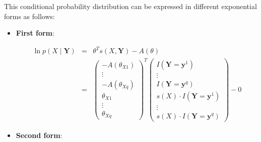 \documentclass[11pt, oneside]{article}   	%
\numberwithin{figure}{section}
\numberwithin{equation}{section}
\numberwithin{table}{section}
\theoremstyle{definition}
\begin{document}
\begin{appendices}
This conditional probability distribution can be expressed in different exponential forms as follows:

\begin{itemize}

\item \textbf{First form}:

\begin{eqnarray*}
\ln p(X \mid \mathbf{Y}) &=& \theta^T s(X,\mathbf{Y}) - A(\theta) \\
&=&
\begin{pmatrix}
- A(\theta_{X1}) \\
\vdots \\
- A(\theta_{Xq}) \\
\theta_{X1} \\
\vdots \\
\theta_{Xq}
\end{pmatrix}^T
\begin{pmatrix}
I(\mathbf{Y} =\mathbf{y}^1) \\
\vdots \\
I(\mathbf{Y} =\mathbf{y}^q) \\
s(X) \cdot I(\mathbf{Y} =\mathbf{y}^1) \\
\vdots \\
s(X) \cdot I(\mathbf{Y} =\mathbf{y}^q)
\end{pmatrix}
- 0 
\end{eqnarray*}

\item \textbf{Second form}:


\end{itemize}
\end{appendices}
\end{document}
